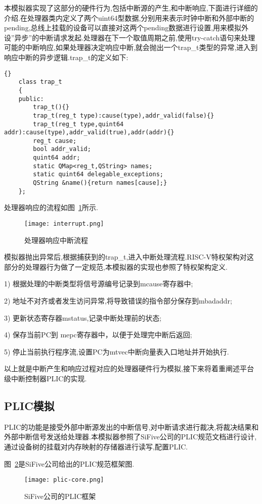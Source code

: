 本模拟器实现了这部分的硬件行为,包括中断源的产生,和中断响应,下面进行详细的介绍.在处理器类内定义了两个uint64型数据,分别用来表示时钟中断和外部中断的pending,总线上挂载的设备可以直接对这两个pending数据进行设置,用来模拟外设”异步”的中断请求发起.处理器在下一个取值周期之前,使用try-catch语句来处理可能的中断响应,如果处理器决定响应中断,就会抛出一个trap\_t类型的异常,进入到响应中断的异步逻辑.trap\_t的定义如下:
\begin{lstlisting}{}
    class trap_t
    {
    public:
        trap_t(){}
        trap_t(reg_t type):cause(type),addr_valid(false){}
        trap_t(reg_t type,quint64 addr):cause(type),addr_valid(true),addr(addr){}
        reg_t cause;
        bool addr_valid;
        quint64 addr;
        static QMap<reg_t,QString> names;
        static quint64 delegable_exceptions;
        QString &name(){return names[cause];}
    };        
\end{lstlisting}

处理器响应的流程如图~\ref{fig:interrupt}所示.
\begin{figure}[h]
    \centering
    \texttt{[image: interrupt.png]}
    \caption{处理器响应中断流程}
    \label{fig:interrupt}
\end{figure}

模拟器抛出异常后,根据捕获到的trap\_t,进入中断处理流程.RISC-V特权架构对这部分的处理器行为做了一定规范,本模拟器的实现也参照了特权架构定义.


1) 根据处理的中断类型将信号源编号记录到mcause寄存器中;


2) 地址不对齐或者发生访问异常,将导致错误的指令部分保存到mbadaddr;


3) 更新状态寄存器mstatus,记录中断处理前的状态;


4) 保存当前PC到 mepc寄存器中，以便于处理完中断后返回;


5) 停止当前执行程序流,设置PC为mtvec中断向量表入口地址并开始执行.


以上就是中断产生和响应过程对应的处理器硬件行为模拟,接下来将着重阐述平台级中断控制器PLIC的实现.


\subsection{PLIC模拟}

PLIC的功能是接受外部中断源发出的中断信号,对中断请求进行裁决,将裁决结果和外部中断信号发送给处理器.本模拟器参照了SiFive公司的PLIC规范文档进行设计,通过设备树的挂载对内存映射的存储器进行读写,配置PLIC.


图~\ref{fig:plic-core}是SiFive公司给出的PLIC规范框架图.
\begin{figure}[h]
    \centering
    \texttt{[image: plic-core.png]}
    \caption{SiFive公司的PLIC框架}
    \label{fig:plic-core}
\end{figure}


